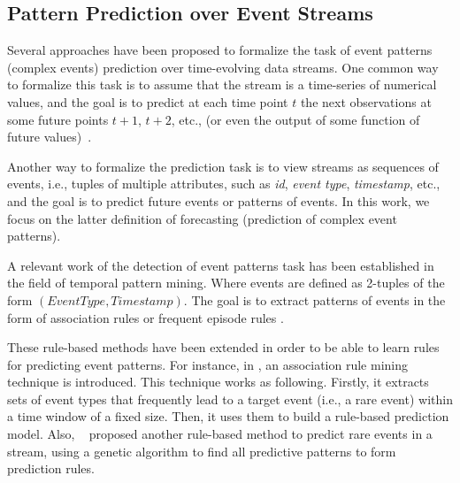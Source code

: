 

\subsection{Pattern Prediction over Event Streams}

\par Several approaches have been proposed to formalize the task of event patterns (complex events) prediction over time-evolving data streams.  One common way to formalize this task is to assume that the stream is a time-series of numerical values, and the goal is to predict at each time point $t$ the next observations at some future points $t+1$, $t+2$, etc., (or even the output of some function of future values)~\cite{montgomery_introduction_2015}. 



\par Another way to formalize the prediction task is to view streams as sequences of events,
i.e., tuples of multiple attributes, such as \textit{id}, \textit{event type}, \textit{timestamp}, etc., and the goal is to predict future events or  patterns of events. In this work, we focus on the latter definition of forecasting (prediction of complex event patterns).  

\par A relevant work of the detection of event patterns task has been established in the field of temporal pattern mining. Where events are defined as 2-tuples of the form \((\mathit{EventType}, \mathit{Timestamp})\). The goal is to extract patterns of events in the form of association rules \cite{agrawal_mining_1993} or frequent episode rules \cite{mannila_discovery_1997}. 

\par These rule-based methods have been extended in order to be able to learn rules for predicting event patterns. For instance, in \cite{vilalta_predicting_2002}, an association rule mining technique is introduced. This technique works as following. Firstly, it extracts sets of event types that frequently lead to a target event (i.e., a rare event) within a time window of a fixed size. Then, it uses them to build a rule-based prediction model. Also,  ~\citet{weiss1998learning} proposed another rule-based method to predict rare events in a stream, using a genetic algorithm to find all predictive patterns to form prediction rules.  


